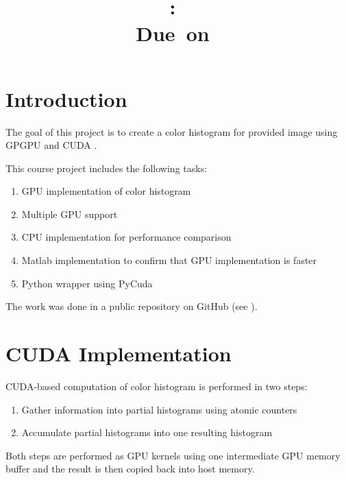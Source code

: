 \documentclass{article}
\title{
\vspace{2in}
\textmd{\textbf{\hmwkClass:\ \hmwkTitle}}\\
\normalsize\vspace{0.1in}\small{Due\ on\ \hmwkDueDate}\\
\vspace{3in}
}
\author{\textbf{\hmwkAuthorName}}
\date{} %
\begin{document}
\maketitle



\newpage
\tableofcontents
\newpage

\section{Introduction}
The goal of this project is to create a color histogram for provided image using
GPGPU and CUDA \cite{CUDA}.

This course project includes the following tasks:

\begin{enumerate}
\item GPU implementation of color histogram \cite{cudahist}
\item Multiple GPU support
\item CPU implementation for performance comparison
\item Matlab implementation to confirm that GPU implementation is faster
\item Python wrapper using PyCuda \cite{pycuda}
\end{enumerate}

The work was done in a public repository on GitHub (see \cite{gh}).

\section{CUDA Implementation}
CUDA-based computation of color histogram is performed in two steps:

\begin{enumerate}
\item Gather information into partial histograms using atomic counters
\item Accumulate partial histograms into one resulting histogram
\end{enumerate}

Both steps are performed as GPU kernels using one intermediate GPU memory buffer
and the result is then copied back into host memory.
\end{document}
